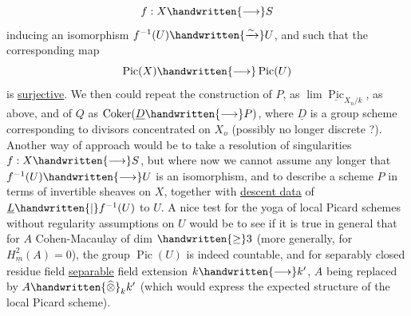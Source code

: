 \[
f:X\handwritten{\longrightarrow}S
\]
inducing an isomorphism $f^{-1}(U)\handwritten{\xrightarrow{\sim}}U$, and such that the corresponding map
\[
\operatorname{Pic}(X)\handwritten{\longrightarrow}\operatorname{Pic}(U)
\]
is \uline{surjective}. We then could repeat the construction of $P$, as $\lim\underline{\operatorname{Pic}}_{X_n/k}$, as above, and of $Q$ as $\operatorname{Coker}(\underline{D}\handwritten{\longrightarrow}P)$, where $\underline{D}$ is a group scheme corresponding to divisors concentrated on $X_o$ (possibly no longer discrete ?). Another way of approach would be to take a resolution of singularities $f:X\handwritten{\longrightarrow}S$, but where now we cannot assume any longer that $f^{-1}(U)\handwritten{\longrightarrow}U$ is an isomorphism, and to describe a scheme $P$ in terms of invertible sheaves on $X$, together with \uline{descent data} of $\underline{L}\handwritten{|}f^{-1}(U)$ to $U$. A nice test for the yoga of local Picard schemes without regularity assumptions on $U$ would be to see if it is true in general that for $A$ Cohen-Macaulay of dim $\handwritten{\geq}3$ (more generally, for $H^2_{\underline{m}}(A)=0$), the group $\operatorname{Pic}(U)$ is indeed countable, and for separably closed residue field   \uline{separable} field extension $k\handwritten{\longrightarrow}k'$, $A$ being replaced by $A\handwritten{\widehat{\otimes}}_k k'$ (which would express the expected  structure of the local Picard scheme).
